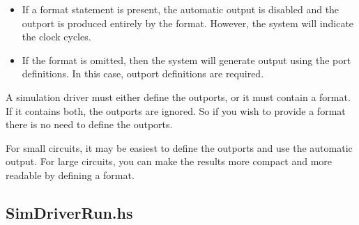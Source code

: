 \documentclass[]{svmono}
\begin{document}
\begin{itemize}
\item If a format statement is present, the automatic output is disabled
and the outport is produced entirely by the format.  However, the
system will indicate the clock cycles.
\item If the format is omitted, then the system will generate output using
the port definitions.  In this case, outport definitions are
required.
\end{itemize}

A simulation driver must either define the outports, or it must
contain a format.  If it contains both, the outports are ignored.  So
if you wish to provide a format there is no need to define the
outports.

For small circuits, it may be easiest to define the outports and use
the automatic output.  For large circuits, you can make the results
more compact and more readable by defining a format.
\subsection*{SimDriverRun.hs}
\label{sec:org3364207}
\end{document}
